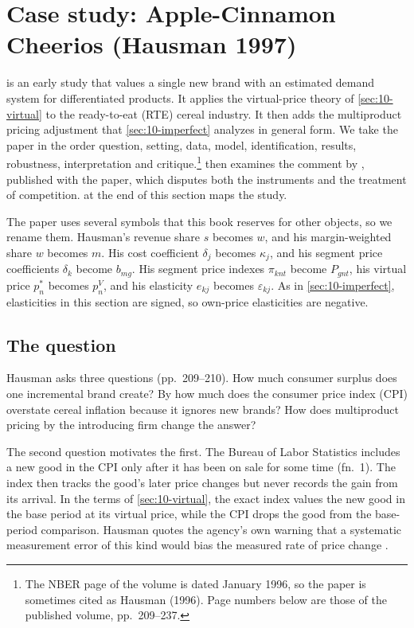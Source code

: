\section{Case study: Apple-Cinnamon Cheerios (Hausman 1997)}\label{sec:10-hausman}

\citet{Hausman1997} is an early study that values a single new brand with an estimated
demand system for differentiated products. It applies the virtual-price theory of \cref{sec:10-virtual} to the ready-to-eat
(RTE) cereal industry. It then adds the multiproduct pricing adjustment that \cref{sec:10-imperfect}
analyzes in general form. We take the paper in the order question, setting, data, model, identification,
results, robustness, interpretation and critique.\footnote{The NBER page of the volume is dated January
1996, so the paper is sometimes cited as Hausman (1996). Page numbers below are those of the published
volume, pp.~209--237.}  then examines the comment by \citet{Bresnahan1997}, published
with the paper, which disputes both the instruments and the treatment of competition. 
at the end of this section maps the study.

The paper uses several symbols that this book reserves for other objects, so we rename them. Hausman's
revenue share $s$ becomes $w$, and his margin-weighted share $w$ becomes $m$. His cost coefficient $\delta_j$
becomes $\kappa_j$, and his segment price coefficients $\delta_k$ become $b_{mg}$. His segment price indexes
$\pi_{knt}$ become $P_{gnt}$, his virtual price $p_n^*$ becomes $p_n^V$, and his elasticity $e_{kj}$ becomes
$\varepsilon_{kj}$. As in \cref{sec:10-imperfect}, elasticities in this section are signed, so own-price
elasticities are negative.

\subsection{The question}\label{sec:10-hausman-question}

Hausman asks three questions (pp.~209--210). How much consumer surplus does one incremental brand create?
By how much does the consumer price index (CPI) overstate cereal inflation because it ignores new brands?
How does multiproduct pricing by the introducing firm change the answer?

The second question motivates the first. The Bureau of Labor Statistics includes a new good in the CPI only
after it has been on sale for some time (fn.~1). The index then tracks the good's later price changes but
never records the gain from its arrival. In the terms of \cref{sec:10-virtual}, the exact index values the
new good in the base period at its virtual price, while the CPI drops the good from the base-period
comparison. Hausman quotes the agency's own warning that a systematic measurement error of this kind would
bias the measured rate of price change \citep[p.~210, quoting][]{Fixler1993}.

